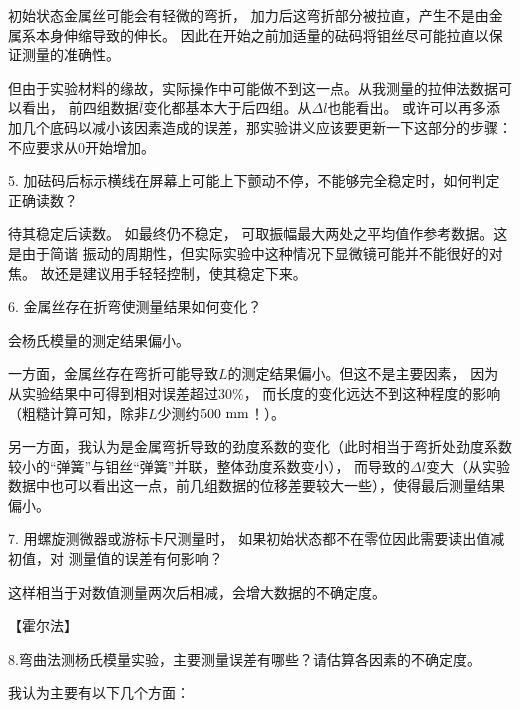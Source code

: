 \documentclass[11pt]{article}
\begin{document}
初始状态金属丝可能会有轻微的弯折，
加力后这弯折部分被拉直，产生不是由金属系本身伸缩导致的伸长。
因此在开始之前加适量的砝码将钼丝尽可能拉直以保证测量的准确性。

但由于实验材料的缘故，实际操作中可能做不到这一点。从我测量的拉伸法数据可以看出，
前四组数据$\overline l$变化都基本大于后四组。从$\Delta l$也能看出。
或许可以再多添加几个底码以减小该因素造成的误差，那实验讲义应该要更新一下这部分的步骤：不应要求从0开始增加。



\bigskip
\begin{kaishu}
    \large  5. 加砝码后标示横线在屏幕上可能上下颤动不停，不能够完全稳定时，如何判定正确读数？
\end{kaishu}

待其稳定后读数。
如最终仍不稳定，
可取振幅最大两处之平均值作参考数据。这是由于简谐
振动的周期性，但实际实验中这种情况下显微镜可能并不能很好的对焦。
故还是建议用手轻轻控制，使其稳定下来。


\bigskip
\begin{kaishu}
    \large 6. 金属丝存在折弯使测量结果如何变化？
\end{kaishu}

会杨氏模量的测定结果偏小。

一方面，金属丝存在弯折可能导致$L$的测定结果偏小。但这不是主要因素，
因为从实验结果中可得到相对误差超过$30\%$，
而长度的变化远达不到这种程度的影响
（粗糙计算可知，除非$L$少测约$500\,\,{\rm mm}$！）。

另一方面，我认为是金属弯折导致的劲度系数的变化（此时相当于弯折处劲度系数较小的“弹簧”与钼丝“弹簧”并联，整体劲度系数变小），
而导致的$\Delta l$变大（从实验数据中也可以看出这一点，前几组数据的位移差要较大一些），使得最后测量结果偏小。



\bigskip
\begin{kaishu}
    \large 7. 用螺旋测微器或游标卡尺测量时，
    如果初始状态都不在零位因此需要读出值减初值，对
测量值的误差有何影响？
\end{kaishu}

这样相当于对数值测量两次后相减，会增大数据的不确定度。

\newpage
\noindent【霍尔法】
\bigskip


\begin{kaishu}
    \large 8.弯曲法测杨氏模量实验，主要测量误差有哪些？请估算各因素的不确定度。
\end{kaishu}

我认为主要有以下几个方面：
\end{document}

